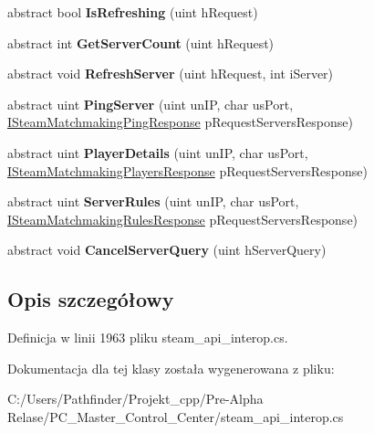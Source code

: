 \begin{DoxyCompactItemize}
abstract bool {\bfseries Is\+Refreshing} (uint h\+Request)
\item 
\mbox{\label{class_valve_1_1_steamworks_1_1_i_steam_matchmaking_servers_aa5423e3bb5a0b706c2ee363e07e0cb5c}} 
abstract int {\bfseries Get\+Server\+Count} (uint h\+Request)
\item 
\mbox{\label{class_valve_1_1_steamworks_1_1_i_steam_matchmaking_servers_a3cc16812c848c04de5c58bc9dfb2dc88}} 
abstract void {\bfseries Refresh\+Server} (uint h\+Request, int i\+Server)
\item 
\mbox{\label{class_valve_1_1_steamworks_1_1_i_steam_matchmaking_servers_ac359171122cacdae93d01f8f81e51d5c}} 
abstract uint {\bfseries Ping\+Server} (uint un\+IP, char us\+Port, \hyperlink{class_valve_1_1_steamworks_1_1_i_steam_matchmaking_ping_response}{I\+Steam\+Matchmaking\+Ping\+Response} p\+Request\+Servers\+Response)
\item 
\mbox{\label{class_valve_1_1_steamworks_1_1_i_steam_matchmaking_servers_a1a7f6684861597e3bf96fa0b2e03f494}} 
abstract uint {\bfseries Player\+Details} (uint un\+IP, char us\+Port, \hyperlink{class_valve_1_1_steamworks_1_1_i_steam_matchmaking_players_response}{I\+Steam\+Matchmaking\+Players\+Response} p\+Request\+Servers\+Response)
\item 
\mbox{\label{class_valve_1_1_steamworks_1_1_i_steam_matchmaking_servers_a6739f8979eaca5ef7fc7f54ede52533a}} 
abstract uint {\bfseries Server\+Rules} (uint un\+IP, char us\+Port, \hyperlink{class_valve_1_1_steamworks_1_1_i_steam_matchmaking_rules_response}{I\+Steam\+Matchmaking\+Rules\+Response} p\+Request\+Servers\+Response)
\item 
\mbox{\label{class_valve_1_1_steamworks_1_1_i_steam_matchmaking_servers_aa5281f08b3c612b54f26fd9f3acabd7d}} 
abstract void {\bfseries Cancel\+Server\+Query} (uint h\+Server\+Query)
\end{DoxyCompactItemize}


\subsection{Opis szczegółowy}


Definicja w linii 1963 pliku steam\+\_\+api\+\_\+interop.\+cs.



Dokumentacja dla tej klasy została wygenerowana z pliku\+:\begin{DoxyCompactItemize}
\item 
C\+:/\+Users/\+Pathfinder/\+Projekt\+\_\+cpp/\+Pre-\/\+Alpha Relase/\+P\+C\+\_\+\+Master\+\_\+\+Control\+\_\+\+Center/steam\+\_\+api\+\_\+interop.\+cs\end{DoxyCompactItemize}
